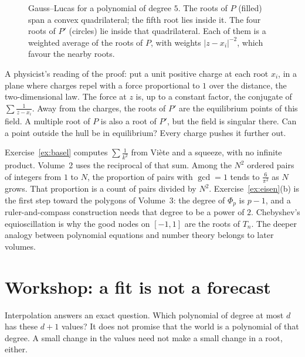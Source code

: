 \begin{figure}[ht]
\centering
{}
\caption{Gauss--Lucas for a polynomial of degree $5$. The roots of $P$ (filled) span a convex quadrilateral; the fifth root lies inside it. The four roots of $P'$ (circles) lie inside that quadrilateral. Each of them is a weighted average of the roots of $P$, with weights $|z-x_i|^{-2}$, which favour the nearby roots.}
\label{fig:gausslucas}
\end{figure}

\begin{think}
A physicist's reading of the proof: put a unit positive charge at each root $x_i$, in a plane where charges repel with a force proportional to $1$ over the distance, the two-dimensional law. The force at $z$ is, up to a constant factor, the conjugate of $\sum\frac1{z-x_i}$. Away from the charges, the roots of $P'$ are the equilibrium points of this field. A multiple root of $P$ is also a root of $P'$, but the field is singular there. Can a point outside the hull be in equilibrium? Every charge pushes it further out.
\end{think}

\begin{beauty}
Exercise~\ref{ex:basel} computes $\sum\frac1{k^2}$ from Vi\`ete and a squeeze, with no infinite product. Volume~2 uses the reciprocal of that sum. Among the $N^2$ ordered pairs of integers from $1$ to $N$, the proportion of pairs with $\gcd=1$ tends to $\frac6{\pi^2}$ as $N$ grows. That proportion is a count of pairs divided by $N^2$. Exercise~\ref{ex:eisen}(b) is the first step toward the polygons of Volume~3: the degree of $\Phi_p$ is $p-1$, and a ruler-and-compass construction needs that degree to be a power of $2$. Chebyshev's equioscillation is why the good nodes on $[-1,1]$ are the roots of $T_n$. The deeper analogy between polynomial equations and number theory belongs to later volumes.
\end{beauty}


\section{Workshop: a fit is not a forecast}

Interpolation answers an exact question. Which polynomial of degree at most $d$ has these $d+1$ values? It does not promise that the world is a polynomial of that degree. A small change in the values need not make a small change in a root, either.

